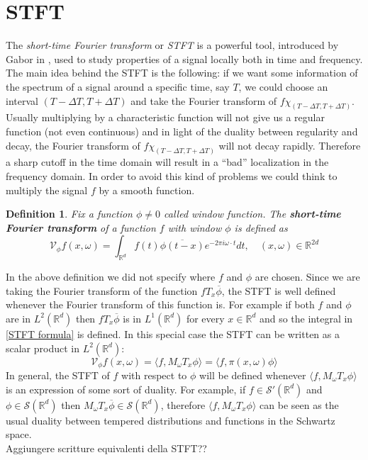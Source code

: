 \documentclass[corpo=11pt, stile=classica, tipotesi=custom,
greek, evenboxes, english]{toptesi}
\numberwithin{equation}{chapter}
\newtheorem{defi}[teo]{Definition}
\theoremstyle{remark}
\newcommand{\R}{\mathbb{R}} %
\newcommand{\V}{\mathcal{V}} %
\begin{document}
\section{STFT}\label{section STFT}
{\color{red}The \emph{short-time Fourier transform} or \emph{STFT} is a powerful tool, introduced by Gabor in \cite{gabor}, used to study properties of a signal locally both in time and frequency. The main idea behind the STFT is the following: if we want some information of the spectrum of a signal around a specific time, say $T$, we could choose an interval $(T-\Delta T, T + \Delta T)$ and take the Fourier transform of $f \chi_{(T-\Delta T, T + \Delta T)}$. Usually multiplying by a characteristic function will not give us a regular function (not even continuous) and in light of the duality between regularity and decay, the Fourier transform of $f \chi_{(T-\Delta T, T + \Delta T)}$ will not decay rapidly. Therefore a sharp cutoff in the time domain will result in a ``bad'' localization in the frequency domain. In order to avoid this kind of problems we could think to multiply the signal $f$ by a smooth function.}
\begin{defi}\label{STFT def}
	Fix a function $\phi \neq 0$ called \emph{window function}. The \textbf{short-time Fourier transform} of a function $f$ with window $\phi$ is defined as
	\begin{equation}\label{STFT formula}
		\V_{\phi}f(x,\omega) = \int_{\R^d} f(t)\overline{\phi(t-x)}e^{-2 \pi i \omega \cdot t} dt, \quad (x,\omega) \in \R^{2d}
	\end{equation}
\end{defi}
In the above definition we did not specify where $f$ and $\phi$ are chosen. Since we are taking the Fourier transform of the function $f T_x\overline{\phi}$, the STFT is well defined whenever the Fourier transform of this function is. For example if both $f$ and $\phi$ are in $L^2(\R^d)$ then $f T_x\overline{\phi}$ is in $L^1(\R^d)$ for every $x \in \R^d$ and so the integral in \eqref{STFT formula} is defined. In this special case the STFT can be written as a scalar product in $L^2(\R^d)$:
\begin{equation*}
	\V_{\phi}f(x,\omega) = \langle f, M_{\omega} T_x \phi \rangle = \langle f, \pi(x,\omega) \phi \rangle
\end{equation*}
In general, the STFT of $f$ with respect to $\phi$ will be defined whenever  $\langle f, M_{\omega} T_x \phi \rangle$ is an expression of some sort of duality. For example, if $f \in \mathcal{S}'(\R^d)$ and $\phi \in \mathcal{S}(\R^d)$ then $M_{\omega} T_x \overline{\phi} \in \mathcal{S}(\R^d)$, therefore $\langle f, M_{\omega} T_x \phi \rangle$ can be seen as the usual duality between tempered distributions and functions in the Schwartz space.\\
{\color{blue} Aggiungere scritture equivalenti della STFT??}
\end{document}
